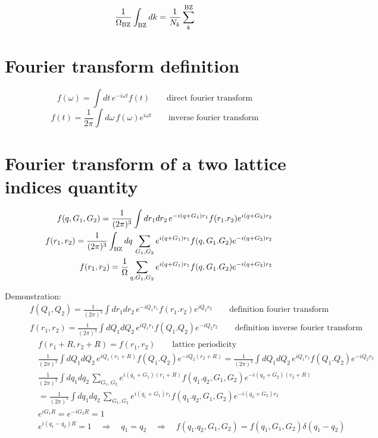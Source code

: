 \documentclass[fleqn]{article}
\begin{document}
\[
\frac{1}{\Omega_{\rm BZ}} \int_{\rm BZ} dk = \frac{1}{N_k} \sum_k^{\rm BZ}
\]

\section{Fourier transform definition}

\[
  f(\omega) = \int dt \, e^{-i\omega t} f(t)
  \qquad \textrm{direct fourier transform}
\]
\[
  f(t) = \frac{1}{2\pi} \int d\omega \, f(\omega) e^{i\omega t}
  \qquad \textrm{inverse fourier transform}
\]

\newpage

\section{Fourier transform of a two lattice indices quantity}

\begin{eqnarray*}
&&
f(q,G_1,G_2) = \frac{1}{(2 \pi)^3} \int dr_1 dr_2 \, e^{-i (q+G_1) r_1} f(r_1.r_2) e^{i (q+G_2) r_2}
\\ &&
f(r_1,r_2) = \frac{1}{(2 \pi)^3} \int_{\rm BZ} dq \, \sum_{G_1,G_2}
e^{i (q+G_1) r_1} f(q,G_1.G_2) e^{-i (q+G_2) r_2}
\\ &&
f(r_1,r_2) = \frac{1}{\Omega} \sum_{q,G_1,G_2}
e^{i (q+G_1) r_1} f(q,G_1.G_2) e^{-i (q+G_2) r_2}
\end{eqnarray*}

Demonstration:
\begin{eqnarray*}
\quad &&
f(Q_1,Q_2) = \frac{1}{(2 \pi)^3} \int dr_1 dr_2 \, e^{-i Q_1 r_1} f(r_1.r_2) e^{i Q_2 r_2}
\qquad \textrm{definition fourier transform}
\\ &&
f(r_1,r_2) = \frac{1}{(2 \pi)^3} \int dQ_1 dQ_2 \, e^{i Q_1 r_1} f(Q_1.Q_2) e^{-i Q_2 r_2}
\qquad \textrm{definition inverse fourier transform}
\\ && \quad
f(r_1+R,r_2+R) = f(r_1,r_2)
\qquad \textrm{lattice periodicity}
\\ && \quad
\frac{1}{(2 \pi)^3} \int dQ_1 dQ_2 \, e^{i Q_1 (r_1+R)} f(Q_1.Q_2) e^{-i Q_2 (r_2+R)}
= \frac{1}{(2 \pi)^3} \int dQ_1 dQ_2 \, e^{i Q_1 r_1} f(Q_1.Q_2) e^{-i Q_2 r_2}
\\ && \quad
\frac{1}{(2 \pi)^3} \int dq_1 dq_2 \, \sum_{G_1,G_2}
e^{i (q_1+G_1) (r_1+R)} f(q_1.q_2,G_1,G_2) e^{-i (q_2+G_2) (r_2+R)}
\\ && \quad
= \frac{1}{(2 \pi)^3} \int dq_1 dq_2 \, \sum_{G_1,G_2}
e^{i (q_1+G_1) r_1} f(q_1.q_2,G_1,G_2) e^{-i (q_2+G_2) r_2}
\\ && \quad
e^{i G_1 R} = e^{-i G_2 R} = 1
\\ && \quad
e^{i (q_1 - q_2) R} = 1 \quad \Rightarrow \quad q_1 = q_2
\quad \Rightarrow \quad f(q_1.q_2,G_1,G_2) = f(q_1,G_1,G_2) \delta(q_1-q_2)
\end{eqnarray*}
\end{document}
